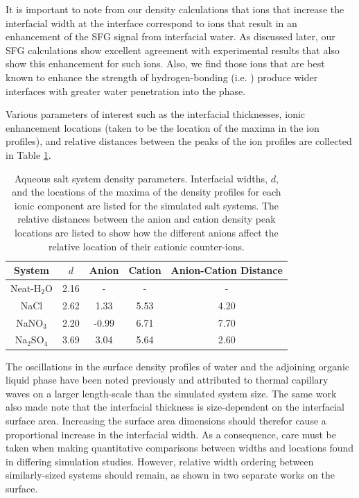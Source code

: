 It is important to note from our density calculations that ions that increase the interfacial width at the \ctcwat interface correspond to ions that result in an enhancement of the SFG signal from interfacial water. As discussed later, our SFG calculations show excellent agreement with experimental results that also show this enhancement for such ions. Also, we find those ions that are best known to enhance the strength of hydrogen-bonding (i.e. \sul) produce wider interfaces with greater water penetration into the \ctc phase.

Various parameters of interest such as the interfacial thicknesses, ionic enhancement locations (taken to be the location of the maxima in the ion profiles), and relative distances between the peaks of the ion profiles are collected in Table \ref{table:double-layer}.

\begin{table}[htdp]
	\begin{center}
	\begin{tabular}{|c||c|c|c|c|}
		\hline
		System & $d$ & Anion & Cation & Anion-Cation Distance \\ \hline
		Neat-H$_2$O & 2.16 & - & - & - \\ 
		NaCl & 2.62 & 1.33 & 5.53 & 4.20 \\
		NaNO$_3$ & 2.20 & -0.99 & 6.71 & 7.70 \\
		Na$_2$SO$_4$ & 3.69 & 3.04 & 5.64 & 2.60 \\
		\hline
	\end{tabular}
	\end{center}
	\caption{Aqueous salt system density parameters. Interfacial widths, $d$, and the locations of the maxima of the density profiles for each ionic component are listed for the simulated salt systems. The relative distances between the anion and cation density peak locations are listed to show how the different anions affect the relative location of their cationic counter-ions.}
	\label{table:double-layer}
\end{table}

The oscillations in the surface density profiles of water and the adjoining organic \ctc liquid phase have been noted previously and attributed to thermal capillary waves on a larger length-scale than the simulated system size.\cite{Chang1996} The same work also made note that the interfacial thickness is size-dependent on the interfacial surface area. Increasing the surface area dimensions should therefor cause a proportional increase in the interfacial width. As a consequence, care must be taken when making quantitative comparisons between widths and locations found in differing simulation studies. However, relative width ordering between similarly-sized systems should remain, as shown in two separate works on the \ctcwat surface.\cite{Chang1996,Hore2008}

